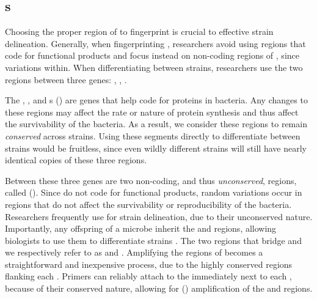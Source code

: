 \subsection{\ITSlong{}s}\label{sec:its}
Choosing the proper region of \dna{} to fingerprint is crucial to effective strain delineation.
Generally, when fingerprinting \fib{}, researchers avoid using regions that code for functional products and focus instead on non-coding regions of \dna{}, since variations within.
When differentiating between \ecoli{} strains, researchers use the two \itsshort{} regions between three genes: \Gsixt{}, \Gtwen{}, \Gfive{}.

The \Gsixt{}, \Gtwen{}, and \Gfive{} \rrnalong{}s (\rrna{}) are genes that help code for proteins in \ecoli{} bacteria.
\index{\Gsixt{}}
\index{\Gtwen{}}
\index{\Gfive{}}
\index{\rrna{}}
\index{\rrnalong{}}
Any changes to these regions may affect the rate or nature of protein synthesis and thus affect the survivability of the bacteria.
As a result, we consider these regions to remain \textit{conserved} across \ecoli{} strains.
Using these segments directly to differentiate between strains would be fruitless, since even wildly different \ecoli{} strains will still have nearly identical copies of these three regions.

Between these three genes are two non-coding, and thus \textit{unconserved}, regions, called \itslong{} (\itsshort{}).
\index{\itslong{}}
\index{\itsshort{}}
Since \itsshort{} do not code for functional products, random variations occur in \itsshort{} regions that do not affect the survivability or reproducibility of the bacteria.
Researchers frequently use \itsshort{} for strain delineation, due to their unconserved nature.
Importantly, any offspring of a microbe inherit the \Ssixt{} and \Sfive{} regions, allowing biologists to use them to differentiate strains \cite{SolimanDVMBNWKG12}.
The two \itsshort{} regions that bridge \Ssixtname{} and \Sfivename{} we respectively refer to as \Ssixt{} and \Sfive{}.
\index{\Ssixtname{}}
\index{\Sfivename{}}
\index{\Ssixt{}}
\index{\Sfive{}}
Amplifying the \itsshort{} regions of \dna{} becomes a straightforward and inexpensive process, due to the highly conserved regions flanking each \itsshort{}.
Primers can reliably attach to the \rrna{} immediately next to each \itsshort{}, because of their conserved nature, allowing for \pcrlong{} (\pcr{}) amplification of the \Ssixt{} and \Sfive{} regions.
\index{\pcrlong{}}
\index{\pcr{}}

